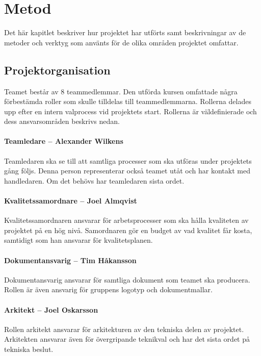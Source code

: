 \chapter{Metod}
\label{cha:method}
Det här kapitlet beskriver hur projektet har utförts samt beskrivningar av de metoder och verktyg som använts för de olika områden projektet omfattar.

\section{Projektorganisation}
Teamet består av 8 teammedlemmar. Den utförda kursen omfattade några förbestämda roller som skulle tilldelas till teammedlemmarna. Rollerna delades upp efter en intern valprocess vid projektets start. Rollerna är väldefinierade och dess ansvarsområden beskrivs nedan.

\subsubsection*{Teamledare -- Alexander Wilkens}
Teamledaren ska se till att samtliga processer som ska utföras under projektets gång följs. Denna person representerar också teamet utåt och har kontakt med handledaren. Om det behövs har teamledaren sista ordet.

\subsubsection*{Kvalitetssamordnare -- Joel Almqvist}
Kvalitetssamordnaren ansvarar för arbetsprocesser som ska hålla kvaliteten av projektet på en hög nivå. Samordnaren gör en budget av vad kvalitet får kosta, samtidigt som han ansvarar för kvalitetsplanen.

\subsubsection*{Dokumentansvarig -- Tim Håkansson}
Dokumentansvarig ansvarar för samtliga dokument som teamet ska producera. Rollen är även ansvarig för gruppens logotyp och dokumentmallar.

\subsubsection*{Arkitekt -- Joel Oskarsson}
Rollen arkitekt ansvarar för arkitekturen av den tekniska delen av projektet. Arkitekten ansvarar även för övergripande teknikval och har det sista ordet på tekniska beslut.

